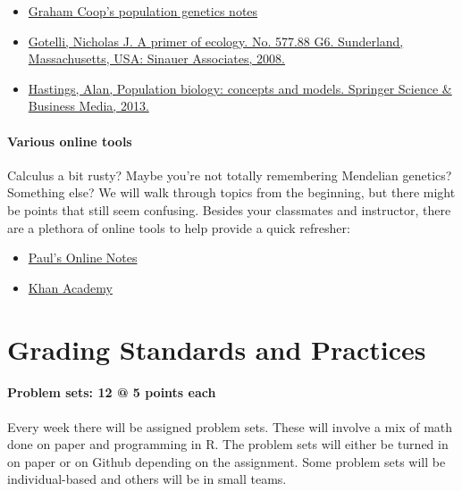 \documentclass[12pt,]{article}
\providecommand{\tightlist}{%
  \setlength{\itemsep}{0pt}\setlength{\parskip}{0pt}}
\let\oldparagraph\paragraph
\renewcommand{\paragraph}[1]{\oldparagraph{#1}\mbox{}}
\begin{document}
\begin{itemize}
\tightlist
\item
  \href{https://github.com/cooplab/popgen-notes}{Graham Coop's
  population genetics notes}
\item
  \href{https://www.amazon.com/Primer-Ecology-Fourth-Nicholas-Gotelli/dp/0878933182/ref=pd_bbs_sr_1?ie=UTF8\&s=books\&qid=1231604546\&sr=8-1}{Gotelli,
  Nicholas J. A primer of ecology. No. 577.88 G6. Sunderland,
  Massachusetts, USA: Sinauer Associates, 2008.}
\item
  \href{https://www.amazon.com/Population-Biology-Concepts-Alan-Hastings/dp/0387948538}{Hastings,
  Alan, Population biology: concepts and models. Springer Science \&
  Business Media, 2013.}
\end{itemize}

\paragraph{Various online tools}\label{various-online-tools}

Calculus a bit rusty? Maybe you're not totally remembering Mendelian
genetics? Something else? We will walk through topics from the
beginning, but there might be points that still seem confusing. Besides
your classmates and instructor, there are a plethora of online tools to
help provide a quick refresher:

\begin{itemize}
\tightlist
\item
  \href{http://tutorial.math.lamar.edu/}{Paul's Online Notes}
\item
  \href{https://www.khanacademy.org/}{Khan Academy}
\end{itemize}

\section{Grading Standards and
Practices}\label{grading-standards-and-practices}

\paragraph{Problem sets: 12 @ 5 points
each}\label{problem-sets-12-5-points-each}

Every week there will be assigned problem sets. These will involve a mix
of math done on paper and programming in R. The problem sets will either
be turned in on paper or on Github depending on the assignment. Some
problem sets will be individual-based and others will be in small teams.
\end{document}
